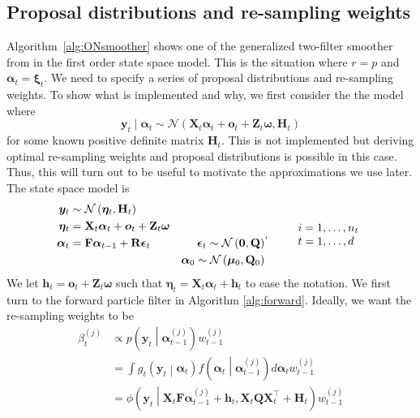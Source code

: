 \documentclass[notitlepage]{article}
\renewcommand{\vec}[1]{\bm{#1}}
\newcommand{\mat}[1]{\mathbf{#1}}
\newcommand{\Lparen}[1]{\left( #1\right)}
\newcommand{\Cond}[2]{ #1 \middle\vert  #2}
\newcommand{\optor}[2]{#1\Lparen{#2}}
\newcommand{\optorC}[3]{\optor{#1}{\Cond{#2}{#3}}}
\newcommand{\pdensC}[2]{\optorC{p}{#1}{#2}}
\newcommand{\normal}[2]{\optor{\mathcal{N}}{#1,#2}}
\newcommand{\normaldC}[3]{\optorC{\phi}{#1}{#2,#3}}
\newcommand{\partic}[3]{#1_{#2}^{\Lparen{#3}}}
\newcommand{\dimState}{p}
\newcommand{\dimRng}{r}
\begin{document}
\subsection{Proposal distributions and re-sampling weights}
Algorithm~\ref{alg:ONsmoother} shows one of the generalized two-filter smoother from
\cite{fearnhead10} in the first order state space model. This is the situation where
$\dimRng = \dimState$ and $\vec\alpha_t = \vec\xi_t$. We need to specify a series of proposal distributions and 
re-sampling weights. To show what is implemented and why, we first 
consider the the model where %
%
$$\vec y_t \mid \vec\alpha_t \sim \normal{%
	\mat{X}_t\vec{\alpha}_t + \vec{o}_t +  \mat{Z}_t\vec{\omega}}{\mat H_t}$$%
%
for some known positive definite matrix $\mat H_t$. This is not implemented but deriving 
optimal re-sampling weights and proposal distributions is possible in this case. Thus, this
will turn out to be useful to motivate the approximations we use
later. The state space model is%
%
$$\begin{aligned}
 	\vec y_t & \sim \normal{\vec\eta_t}{\mat H_t} &  \\
%
 	\vec{\eta}_{t} &= \mat{X}_t\vec{\alpha}_t + \vec{o}_t +   
 	\mat{Z}_t\vec\omega & \\
%
 	\vec{\alpha}_t &= \mat{F}\vec{\alpha}_{t - 1} + \mat{R}\vec{\epsilon}_t&
 		\vec{\epsilon}_t \sim \normal{\vec{0}}{\mat{Q}} \\
%
	& \vphantom{a} &	\vec{\alpha}_0 \sim \normal{\vec\mu_0}{\mat{Q}_0}
\end{aligned}, \qquad
%
\begin{array}{l} i = 1, \dots, n_t \\ t = 1, \dots, d \end{array}$$%
%
We let $\vec h_t = \vec{o}_t + \mat{Z}_t\vec\omega$ such that 
$\vec \eta_t = \mat X_t\vec \alpha_t + \vec h_t$ to ease the notation.  
We first turn to the forward particle filter in Algorithm \ref{alg:forward}. Ideally, we 
want the re-sampling weights to be 
%
\begin{align}\label{eq:fwReWeight}
\partic\beta tj &\propto \pdensC{\vec y_t}{\partic{\vec\alpha}{t-1}j}\partic w{t-1}j \\
	&=\int \optorC{g_t}{\vec y_t}{\vec\alpha_t}
		\optorC{f}{\vec\alpha_t}{\partic{\vec\alpha}{t-1}j}d\vec\alpha_t \partic w{t-1}j \nonumber\\
	&= \normaldC{\vec y_t }{\mat X_t\mat F\partic{\vec\alpha}{t-1}j + \vec h_t}{%
	\mat X_t \mat Q \mat X_t^\top + \mat H_t}
	\partic w{t-1}j\nonumber
\end{align}%
\end{document}
